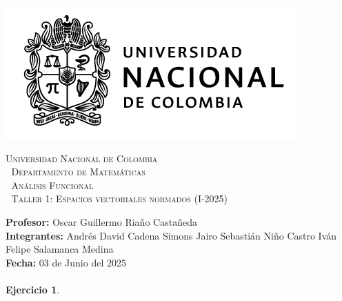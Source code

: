 \thispagestyle{empty}

\begin{minipage}{0.3\textwidth}
  \includegraphics[scale=0.35]{logounal.png}
\end{minipage}%
\hfill
\begin{minipage}{0.65\textwidth}
  \begin{center}
    \scshape
    \Large \textsc{Universidad Nacional de Colombia} \\
    \textcolor{white}{\tiny.} \Large \textsc{Departamento de Matemáticas} \\
    \textcolor{white}{\tiny.} \large \textsc{Análisis Funcional} \\
    \textcolor{white}{\tiny.} \large \textsf{Taller 1: Espacios vectoriales normados} \normalsize (I-2025)
  \end{center}
\end{minipage}

\vspace{0.3cm}
\normalfont

\textbf{Profesor:} Oscar Guillermo Riaño Castañeda\\
\textbf{Integrantes:} Andrés David Cadena Simons \hspace{2.8cm}  Jairo Sebastián Niño Castro\hspace{2.8cm}
Iván Felipe Salamanca Medina\\
\hspace*{2.1cm}\hspace{2.25cm}\textbf{Fecha:} 03 de Junio del 2025\\
\vspace{0.25cm}\\

\textbf{Ejercicio 1}.

